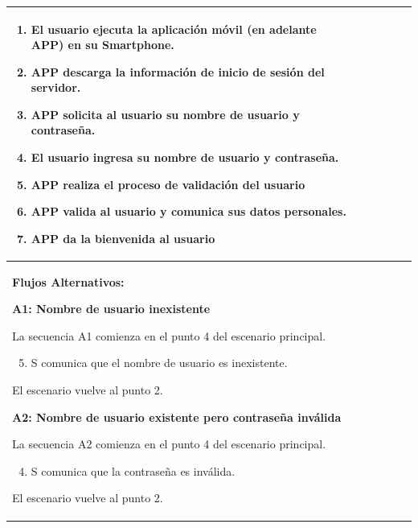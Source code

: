 \begin{longtable}{|l|p{5.5cm}|l|p{2cm}|l|p{1.9cm}|}
{				\begin{enumerate}
					\item El usuario ejecuta la aplicación móvil (en adelante APP) en su Smartphone.
					\item APP descarga la información de inicio de sesión del servidor.
					\item APP solicita al usuario su nombre de usuario y contraseña.
					\item El usuario ingresa su nombre de usuario y contraseña.
					\item APP realiza el proceso de validación del usuario
					\item APP valida al usuario y comunica sus datos personales.
					\item APP da la bienvenida al usuario
				\end{enumerate}

				} \\ \hline

				\multicolumn{6}{|p{15cm}|}{ \textbf{Flujos Alternativos: }

				\textbf{A1: Nombre de usuario inexistente}
				
				La secuencia A1 comienza en el punto 4 del escenario principal.
				\begin{enumerate}
						\setcounter{enumi}{4}
						\item S comunica que el nombre de usuario es inexistente.
				\end{enumerate}

				El escenario vuelve al punto 2.

				\textbf{A2: Nombre de usuario existente pero contraseña inválida}
				
				La secuencia A2 comienza en el punto 4 del escenario principal.
				\begin{enumerate}
						\setcounter{enumi}{3}
						\item S comunica que la contraseña es inválida.
				\end{enumerate}

				El escenario vuelve al punto 2.

				} \\ \hline
			\end{longtable}

